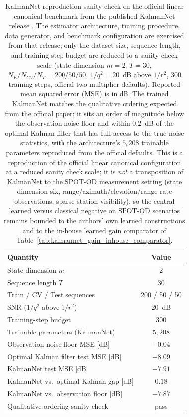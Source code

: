 \begin{table}[t]
  \centering
  \caption{KalmanNet reproduction sanity check on the official linear canonical benchmark from the published KalmanNet release \cite{revach2022kalmannet}. The estimator architecture, training procedure, data generator, and benchmark configuration are exercised from that release; only the dataset size, sequence length, and training step budget are reduced to a sanity check scale (state dimension $m=2$, $T=30$, $N_E/N_{CV}/N_T = 200/50/50$, $1/q^2 = 20$~dB above $1/r^2$, $300$ training steps, official two multiplier defaults). Reported mean squared error (MSE) is in dB. The trained KalmanNet matches the qualitative ordering expected from the official paper: it sits an order of magnitude below the observation noise floor and within $0.2$~dB of the optimal Kalman filter that has full access to the true noise statistics, with the architecture's $5{,}208$ trainable parameters reproduced from the official defaults. This is a reproduction of the official linear canonical configuration at a reduced sanity check scale; it is \emph{not} a transposition of KalmanNet to the SPOT-OD measurement setting (state dimension six, range/azimuth/elevation/range-rate observations, sparse station visibility), so the central learned versus classical negative on SPOT-OD scenarios remains bounded to the authors' own learned constructions and to the in-house learned gain comparator of Table~\ref{tab:kalmannet_gain_inhouse_comparator}.}
  \label{tab:kalmannet_official_reproduction}
  \begin{tabular}{lc}
    \toprule
    Quantity & Value \\
    \midrule
    State dimension $m$ & 2 \\
    Sequence length $T$ & 30 \\
    Train / CV / Test sequences & 200 / 50 / 50 \\
    SNR ($1/q^{2}$ above $1/r^{2}$) & $20$~dB \\
    Training-step budget & 300 \\
    Trainable parameters (KalmanNet) & $5{,}208$ \\
    Observation noise floor MSE [dB] & $-0.04$ \\
    Optimal Kalman filter test MSE [dB] & $-8.09$ \\
    KalmanNet test MSE [dB] & $-7.91$ \\
    KalmanNet vs.\ optimal Kalman gap [dB] & $0.18$ \\
    KalmanNet vs.\ observation floor [dB] & $-7.87$ \\
    Qualitative-ordering sanity check & pass \\
    \bottomrule
  \end{tabular}
\end{table}
